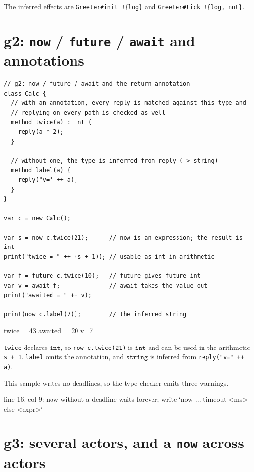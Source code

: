 \documentclass[11pt,a4paper]{article}
\newcommand{\ty}[1]{\ensuremath{\mathtt{#1}}}
\begin{document}
The inferred effects are \texttt{Greeter\#init !\{log\}} and
\texttt{Greeter\#tick !\{log, mut\}}.

\section{g2: \texttt{now} / \texttt{future} / \texttt{await} and annotations}

\begin{lstlisting}
// g2: now / future / await and the return annotation
class Calc {
  // with an annotation, every reply is matched against this type and
  // replying on every path is checked as well
  method twice(a) : int {
    reply(a * 2);
  }

  // without one, the type is inferred from reply (-> string)
  method label(a) {
    reply("v=" ++ a);
  }
}

var c = new Calc();

var s = now c.twice(21);      // now is an expression; the result is int
print("twice = " ++ (s + 1)); // usable as int in arithmetic

var f = future c.twice(10);   // future gives future int
var v = await f;              // await takes the value out
print("awaited = " ++ v);

print(now c.label(7));        // the inferred string
\end{lstlisting}

\begin{term}
twice = 43
awaited = 20
v=7
\end{term}

\texttt{twice} declares \ty{int}, so \texttt{now c.twice(21)} is \ty{int} and
can be used in the arithmetic \texttt{s + 1}. \texttt{label} omits the
annotation, and \ty{string} is inferred from \texttt{reply("v=" ++ a)}.

This sample writes no deadlines, so the type checker emits three warnings.

\begin{term}
[warn] line 16, col 9: now without a deadline waits forever;
  write `now ... timeout <ms> else <expr>`
\end{term}

\section{g3: several actors, and a \texttt{now} across actors}
\end{document}
